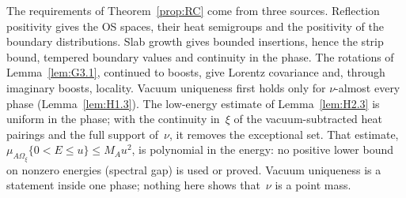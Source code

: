 The requirements of Theorem~\ref{prop:RC} come from three sources. Reflection positivity gives the OS spaces, their heat semigroups and the positivity of the boundary distributions. Slab growth gives bounded insertions, hence the strip bound, tempered boundary values and continuity in the phase. The rotations of Lemma~\ref{lem:G3.1}, continued to boosts, give Lorentz covariance and, through imaginary boosts, locality. Vacuum uniqueness first holds only for $\nu$-almost every phase (Lemma~\ref{lem:H1.3}). The low-energy estimate of Lemma~\ref{lem:H2.3} is uniform in the phase; with the continuity in~$\xi$ of the vacuum-subtracted heat pairings and the full support of~$\nu$, it removes the exceptional set. That estimate, $\mu_{A\Omega_\xi}\{0<E\le u\}\le M_Au^2$, is polynomial in the energy: no positive lower bound on nonzero energies (spectral gap) is used or proved. Vacuum uniqueness is a statement inside one phase; nothing here shows that~$\nu$ is a point mass.

